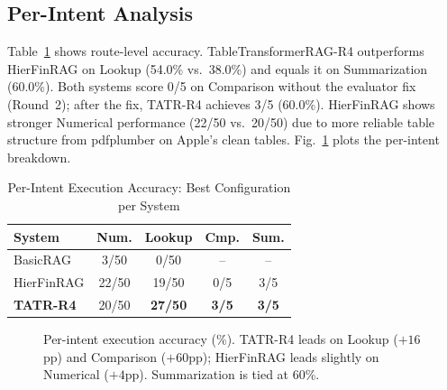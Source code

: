 \documentclass[conference]{IEEEtran}
\newcommand{\best}[1]{\textbf{#1}}
\begin{document}
\subsection{Per-Intent Analysis}

Table~\ref{tab:intent} shows route-level accuracy. TableTransformerRAG-R4
outperforms HierFinRAG on Lookup (54.0\% vs.\ 38.0\%) and equals it on
Summarization (60.0\%). Both systems score 0/5 on Comparison without the
evaluator fix (Round~2); after the fix, TATR-R4 achieves 3/5 (60.0\%).
HierFinRAG shows stronger Numerical performance (22/50 vs.\ 20/50) due to
more reliable table structure from pdfplumber on Apple's clean tables.
Fig.~\ref{fig:perintent} plots the per-intent breakdown.

\begin{table}[htbp]
\caption{Per-Intent Execution Accuracy: Best Configuration per System}
\label{tab:intent}
\centering
\renewcommand{\arraystretch}{1.2}
\begin{tabular}{l c c c c}
\toprule
\textbf{System} & \textbf{Num.} & \textbf{Lookup} & \textbf{Cmp.} & \textbf{Sum.} \\
\midrule
BasicRAG       & 3/50  & 0/50  & --   & --  \\
HierFinRAG     & 22/50 & 19/50 & 0/5  & 3/5 \\
\rowcolor{bestrow}
\textbf{TATR-R4} & 20/50 & \best{27/50} & \best{3/5} & \best{3/5} \\
\bottomrule
\end{tabular}
\end{table}

\begin{figure}[htbp]
\centering
{}
\caption{Per-intent execution accuracy (\%). TATR-R4 leads on Lookup
($+16$pp) and Comparison ($+60$pp); HierFinRAG leads slightly on
Numerical ($+4$pp). Summarization is tied at 60\%.}
\label{fig:perintent}
\end{figure}
\end{document}

